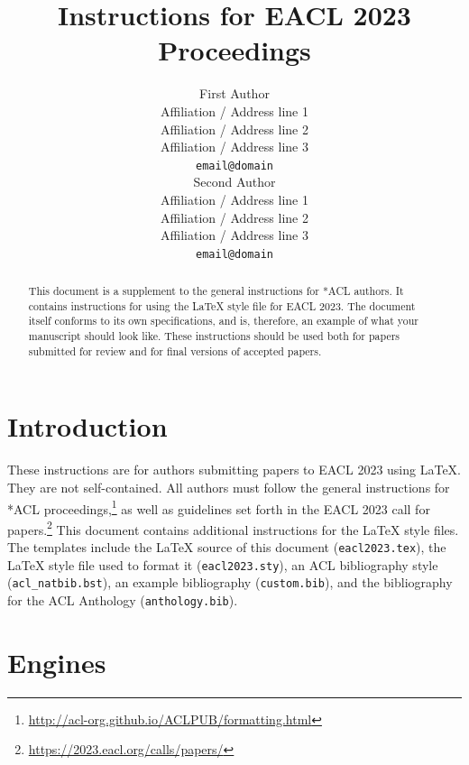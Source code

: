\documentclass[11pt]{article}
\title{Instructions for EACL 2023 Proceedings}
\author{First Author \\
  Affiliation / Address line 1 \\
  Affiliation / Address line 2 \\
  Affiliation / Address line 3 \\
  \texttt{email@domain} \\\And
  Second Author \\
  Affiliation / Address line 1 \\
  Affiliation / Address line 2 \\
  Affiliation / Address line 3 \\
  \texttt{email@domain} \\}
\begin{document}
\maketitle
\begin{abstract}
This document is a supplement to the general instructions for *ACL authors. It contains instructions for using the \LaTeX{} style file for EACL 2023.
The document itself conforms to its own specifications, and is, therefore, an example of what your manuscript should look like.
These instructions should be used both for papers submitted for review and for final versions of accepted papers.
\end{abstract}

\section{Introduction}

These instructions are for authors submitting papers to EACL 2023 using \LaTeX. They are not self-contained. All authors must follow the general instructions for *ACL proceedings,\footnote{\url{http://acl-org.github.io/ACLPUB/formatting.html}} as well as guidelines set forth in the EACL 2023 call for papers.\footnote{\url{https://2023.eacl.org/calls/papers/}} This document contains additional instructions for the \LaTeX{} style files.
The templates include the \LaTeX{} source of this document (\texttt{eacl2023.tex}),
the \LaTeX{} style file used to format it (\texttt{eacl2023.sty}),
an ACL bibliography style (\texttt{acl\_natbib.bst}),
an example bibliography (\texttt{custom.bib}),
and the bibliography for the ACL Anthology (\texttt{anthology.bib}).

\section{Engines}
\end{document}
